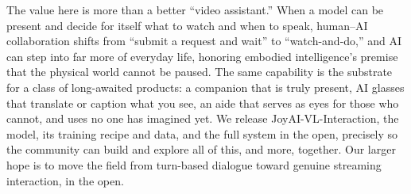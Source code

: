 
The value here is more than a better ``video assistant.'' When a model can be present and decide for itself what to watch and when to speak, human--AI collaboration shifts from ``submit a request and wait'' to ``watch-and-do,'' and AI can step into far more of everyday life, honoring embodied intelligence's premise that the physical world cannot be paused. The same capability is the substrate for a class of long-awaited products: a companion that is truly present, AI glasses that translate or caption what you see, an aide that serves as eyes for those who cannot, and uses no one has imagined yet. We release  JoyAI-VL-Interaction, the model, its training recipe and data, and the full system in the open, precisely so the community can build and explore all of this, and more, together. Our larger hope is to move the field from turn-based dialogue toward genuine streaming interaction, in the open.

